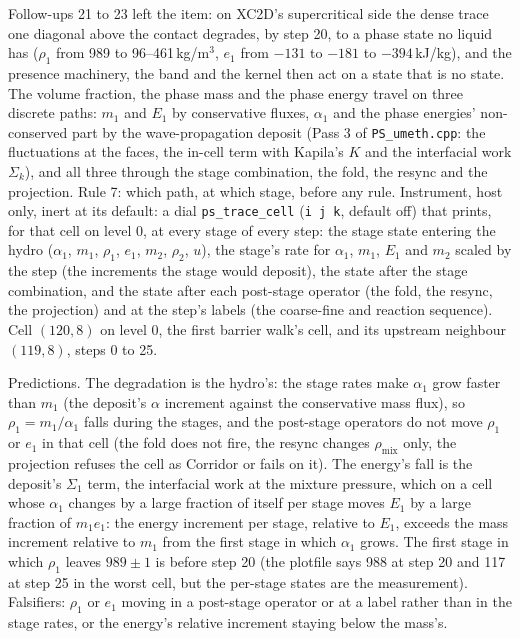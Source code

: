 \documentclass[11pt,a4paper]{article}
\newcommand{\code}[1]{\texttt{\small #1}}
\begin{document}
Follow-ups 21 to 23 left the item: on XC2D's supercritical side the
dense trace one diagonal above the contact degrades, by step 20, to a
phase state no liquid has ($\rho_1$ from 989 to 96--461\,kg/m$^3$,
$e_1$ from $-131$ to $-181$ to $-394$\,kJ/kg), and the presence
machinery, the band and the kernel then act on a state that is no
state.  The volume fraction, the phase mass and the phase energy travel
on three discrete paths: $m_1$ and $E_1$ by conservative fluxes, $\alpha_1$
and the phase energies' non-conserved part by the wave-propagation
deposit (Pass 3 of \code{PS\_umeth.cpp}: the fluctuations at the faces,
the in-cell term with Kapila's $K$ and the interfacial work $\Sigma_k$),
and all three through the stage combination, the fold, the resync and
the projection.  Rule 7: which path, at which stage, before any rule.
Instrument, host only, inert at its default: a dial
\code{ps\_trace\_cell} (\code{i j k}, default off) that prints, for that
cell on level 0, at every stage of every step: the stage state entering
the hydro ($\alpha_1$, $m_1$, $\rho_1$, $e_1$, $m_2$, $\rho_2$, $u$),
the stage's rate for $\alpha_1$, $m_1$, $E_1$ and $m_2$ scaled by the
step (the increments the stage would deposit), the state after the
stage combination, and the state after each post-stage operator (the
fold, the resync, the projection) and at the step's labels (the
coarse-fine and reaction sequence).  Cell $(120, 8)$ on level 0, the
first barrier walk's cell, and its upstream neighbour $(119, 8)$,
steps 0 to 25.

Predictions.  The degradation is the hydro's: the stage rates make
$\alpha_1$ grow faster than $m_1$ (the deposit's $\alpha$ increment
against the conservative mass flux), so $\rho_1 = m_1/\alpha_1$ falls
during the stages, and the post-stage operators do not move $\rho_1$
or $e_1$ in that cell (the fold does not fire, the resync changes
$\rho_{\mathrm{mix}}$ only, the projection refuses the cell as
Corridor or fails on it).  The energy's fall is the deposit's
$\Sigma_1$ term, the interfacial work at the mixture pressure, which
on a cell whose $\alpha_1$ changes by a large fraction of itself per
stage moves $E_1$ by a large fraction of $m_1 e_1$: the energy
increment per stage, relative to $E_1$, exceeds the mass increment
relative to $m_1$ from the first stage in which $\alpha_1$ grows.  The
first stage in which $\rho_1$ leaves $989 \pm 1$ is before step 20 (the
plotfile says 988 at step 20 and 117 at step 25 in the worst cell, but
the per-stage states are the measurement).  Falsifiers: $\rho_1$ or
$e_1$ moving in a post-stage operator or at a label rather than in the
stage rates, or the energy's relative increment staying below the
mass's.
\end{document}
